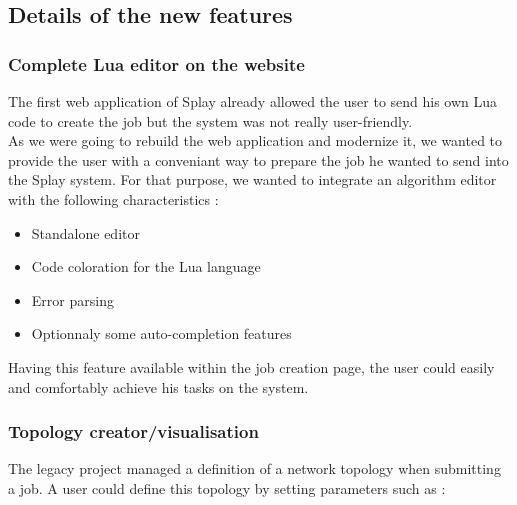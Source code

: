 \documentclass{eplmastersthesis}
\begin{document}


      \subsection{Details of the new features}

        \subsubsection{Complete Lua editor on the website}

          The first web application of Splay already allowed the user to send
          his own Lua code to create the job but the system was not really
          user-friendly.\\

          As we were going to rebuild the web application and modernize it,
          we wanted to provide the user with a conveniant way to prepare
          the job he wanted to send into the Splay system. For that purpose,
          we wanted to integrate an algorithm editor with the following
          characteristics :

          \begin{itemize}
            \item Standalone editor
            \item Code coloration for the Lua language
            \item Error parsing
            \item Optionnaly some auto-completion features
          \end{itemize}

          Having this feature available within the job creation page, the user
          could easily and comfortably achieve his tasks on the system.

        \subsubsection{Topology creator/visualisation}

          The legacy project managed a definition of a network topology when
          submitting a job. A user could define this topology by setting
          parameters such as :
\end{document}
